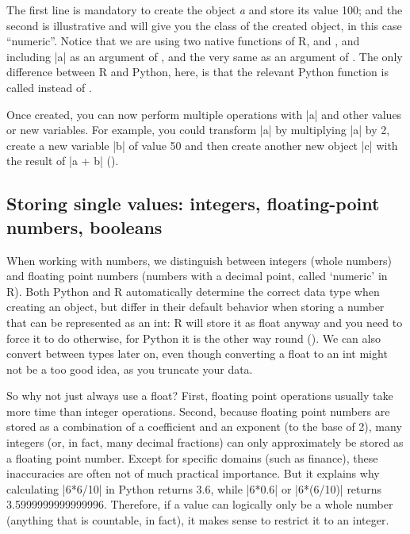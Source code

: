 The first line is mandatory to create the object \emph{a} and store
its value 100; and the second is illustrative and will give you the
class of the created object, in this case ``numeric''. Notice that we
are using two native functions of R,  and , and
including |a| as an argument of , and the very same
 as an argument of . The only difference
between R and Python, here, is that the relevant Python function is
called  instead of .

Once created, you can now perform multiple operations
with |a| and other values or new variables. For example, you
could transform |a| by multiplying |a| by 2, create a new
variable |b| of value 50 and then create another new object
|c| with the result of |a + b| ().





\subsection{Storing single values: integers, floating-point numbers, booleans}

When working with numbers, we distinguish between integers (whole
numbers) and floating point numbers (numbers with a decimal point,
called `numeric' in R). Both Python and R automatically determine the
correct data type when creating an object, but differ in their default
behavior when storing a number that can be represented as an int: R
will store it as float anyway and you need to force it to do
otherwise, for Python it is the other way round
(). We can also convert between types later on,
even though converting a float to an int might not be a too good idea,
as you truncate your data.

So why not just always use a float? First,
floating point operations usually take more time than integer operations.
Second, because floating point numbers are stored as a combination of
a coefficient and an exponent (to the base of 2), many integers (or,
in fact, many decimal fractions) can only approximately be stored
as a floating point number. Except for specific domains (such
as finance), these inaccuracies are often not of much practical importance.
But it explains why calculating |6*6/10| in Python returns 3.6, while
|6*0.6| or |6*(6/10)| returns 3.5999999999999996. Therefore, if
a value can logically only be a whole number (anything that is
countable, in fact), it makes sense to restrict it to an integer.

